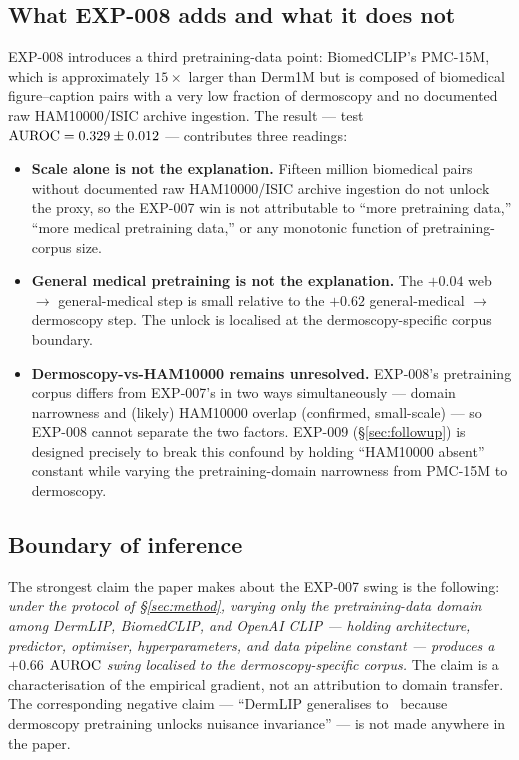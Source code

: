 \subsection{What EXP-008 adds and what it does not}
EXP-008 introduces a third pretraining-data point: BiomedCLIP's PMC-15M,
which is approximately $15\times$ larger than Derm1M but is composed of
biomedical figure--caption pairs with a very low fraction of
dermoscopy and no documented raw HAM10000/ISIC archive ingestion. The result --- test
$\mathrm{AUROC} = 0.329 \pm 0.012$ --- contributes three readings:
\begin{itemize}
\item \textbf{Scale alone is not the explanation.} Fifteen million
      biomedical pairs without documented raw HAM10000/ISIC archive
      ingestion do not unlock the proxy, so the
      EXP-007 win is not attributable to ``more pretraining data,''
      ``more medical pretraining data,'' or any monotonic function of
      pretraining-corpus size.
\item \textbf{General medical pretraining is not the explanation.} The
      $+0.04$ web $\to$ general-medical step is small relative to the
      $+0.62$ general-medical $\to$ dermoscopy step. The unlock is
      localised at the dermoscopy-specific corpus boundary.
\item \textbf{Dermoscopy-vs-HAM10000 remains unresolved.} EXP-008's
      pretraining corpus differs from EXP-007's in two ways
      simultaneously --- domain narrowness and (likely) HAM10000
      overlap (confirmed, small-scale) --- so
      EXP-008 cannot separate the two factors. EXP-009
      (\S\ref{sec:followup}) is designed precisely to break this
      confound by holding ``HAM10000 absent'' constant while varying
      the pretraining-domain narrowness from PMC-15M to dermoscopy.
\end{itemize}

\subsection{Boundary of inference}
The strongest claim the paper makes about the EXP-007 swing is the
following: \emph{under the protocol of \S\ref{sec:method}, varying only
the pretraining-data domain among DermLIP, BiomedCLIP, and OpenAI
CLIP --- holding architecture, predictor, optimiser, hyperparameters,
and data pipeline constant --- produces a $+0.66$ $\mathrm{AUROC}$ swing
localised to the dermoscopy-specific corpus.} The claim is a
characterisation of the empirical gradient, not an attribution to
domain transfer. The corresponding negative claim --- ``DermLIP
generalises to \strongholdtwo\ because dermoscopy pretraining unlocks
nuisance invariance'' --- is not made anywhere in the paper.
